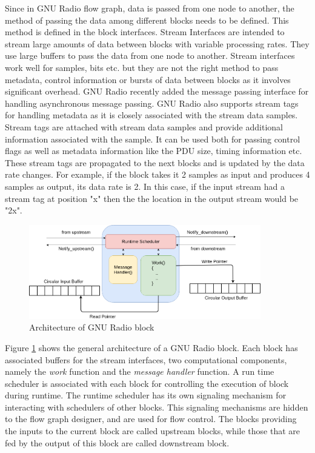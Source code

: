 Since in GNU Radio flow graph, data is passed from one node to another, the method of passing the data among different blocks needs to be defined.
This method is defined in the block interfaces.
Stream Interfaces are intended to stream large amounts of data between blocks with variable processing rates.
They use large buffers to pass the data from one node to another.
Stream interfaces work well for samples, bits etc. but they are not the right method to pass metadata, control information or bursts of data between blocks as it involves significant overhead.
GNU Radio recently added the message passing interface for handling asynchronous message passing.
GNU Radio also supports stream tags for handling metadata as it is closely associated with the stream data samples.
Stream tags are attached with stream data samples and provide additional information associated with the sample.
It can be used both for passing control flags as well as metadata information like the \ac{PDU} size, timing information etc.
These stream tags are propagated to the next blocks and is updated by the data rate changes.
For example, if the block takes it 2 samples as input and produces 4 samples as output, its data rate is 2.
In this case, if the input stream had a stream tag at position "x" then the the location in the output stream would be "2x". 


\begin{figure}[h!]
\centering
\includegraphics[width=0.9\textwidth]{Figure/Block.png}
\caption{Architecture of GNU Radio block}
\label{block_arch}
\end{figure}

Figure \ref{block_arch} shows the general architecture of a GNU Radio block. 
Each block has associated buffers for the stream interfaces, two computational components, namely the \textit{work} function and the \textit{message handler} function.
A run time scheduler is associated with each block for controlling the execution of block during runtime. The runtime scheduler has its own signaling mechanism for interacting with schedulers of other blocks.
This signaling mechanisms are hidden to the flow graph designer, and are used for flow control.
The blocks providing the inputs to the current block are called upstream blocks, while those that are fed by the output of this block are called downstream block.\\

